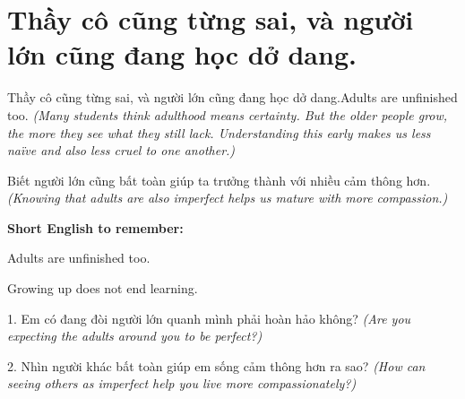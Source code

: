 \section{Thầy cô cũng từng sai, và người lớn cũng đang học dở dang.}
\begin{truyen}{Thầy cô cũng từng sai, và người lớn cũng đang học dở dang.}{Adults are unfinished too.}
\textit{(Many students think adulthood means certainty. But the older people grow, the more they see what they still lack. Understanding this early makes us less naïve and also less cruel to one another.)}
\end{truyen}
\begin{baihoc}
Biết người lớn cũng bất toàn giúp ta trưởng thành với nhiều cảm thông hơn.
\textit{(Knowing that adults are also imperfect helps us mature with more compassion.)}
\end{baihoc}
\begin{ghinhoanh}
\textbf{Short English to remember:}

Adults are unfinished too.

Growing up does not end learning.
\end{ghinhoanh}
\begin{tuhocnhanh}
1. Em có đang đòi người lớn quanh mình phải hoàn hảo không? \textit{(Are you expecting the adults around you to be perfect?)}

2. Nhìn người khác bất toàn giúp em sống cảm thông hơn ra sao? \textit{(How can seeing others as imperfect help you live more compassionately?)}
\end{tuhocnhanh}
\ngancach

